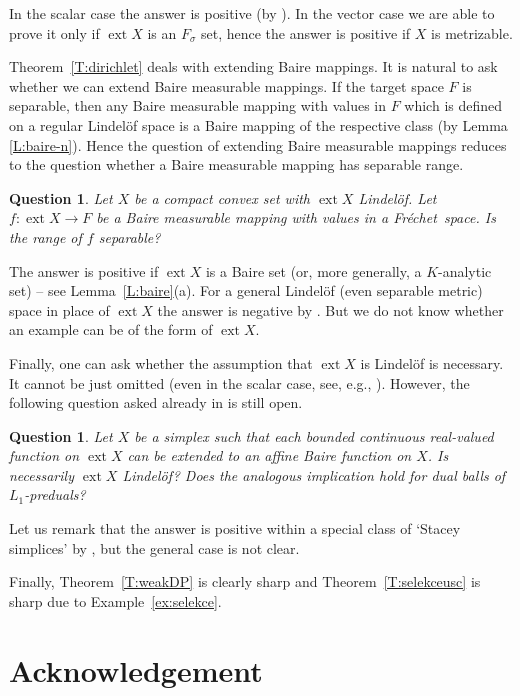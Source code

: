 \documentclass{amsart}
\numberwithin{equation}{section}
\newtheorem{question}[thm]{Question}
\theoremstyle{definition}
\def \ext {\operatorname{ext}}
\newcommand{\fr}{Fr\'echet\ }
\begin{document}
In the scalar case the answer is positive (by \cite{spu-ka,lusp23,lusp-complex}). In the vector case we are able to prove it
only if $\ext X$ is an $F_\sigma$ set, hence the answer is positive if $X$ is metrizable.

Theorem~\ref{T:dirichlet} deals with extending Baire mappings. It is natural to ask whether we can extend Baire measurable mappings. If the target space $F$ is separable, then any Baire measurable mapping with values in $F$ which is defined on a regular Lindel\"of space is a Baire mapping of the respective class (by Lemma \ref{L:baire-n}).
Hence the question of extending Baire measurable mappings reduces to the question whether a Baire measurable mapping has separable range.

\begin{question} Let $X$ be a compact convex set with $\ext X$ Lindel\"of. Let $f:\ext X\to F$ be a Baire measurable mapping with values in a \fr space. Is the range of $f$ separable?\end{question}

The answer is positive if $\ext X$ is a Baire set (or, more generally, a $K$-analytic set) -- see Lemma~\ref{L:baire}(a).
For a general Lindel\"of (even separable metric) space in place of $\ext X$ the answer is negative by \cite[Example 2.4(3)]{koumou}. But we do not know whether an example can be of the form of  $\ext X$.

Finally, one can ask whether the assumption that $\ext X$ is Lindel\"of is necessary. It cannot be just omitted
(even in the scalar case, see, e.g., \cite[Theorem 4]{kalenda-bpms}). However, the following question asked already in \cite{Jel} is still open.

\begin{question}\label{q:lind} Let $X$ be a simplex such that each bounded continuous real-valued function on $\ext X$ can be extended to an affine Baire function on $X$. Is necessarily $\ext X$ Lindel\"of?
Does the analogous implication hold for dual balls of $L_1$-preduals?
\end{question}

Let us remark that the answer is positive within a special class of `Stacey simplices' by \cite[Theorems 2 and 6]{kalenda-bpms},
but the general case is not clear.

Finally, Theorem~\ref{T:weakDP} is clearly sharp and Theorem~\ref{T:selekceusc} is sharp due to Example~\ref{ex:selekce}.

\section*{Acknowledgement}
\end{document}
